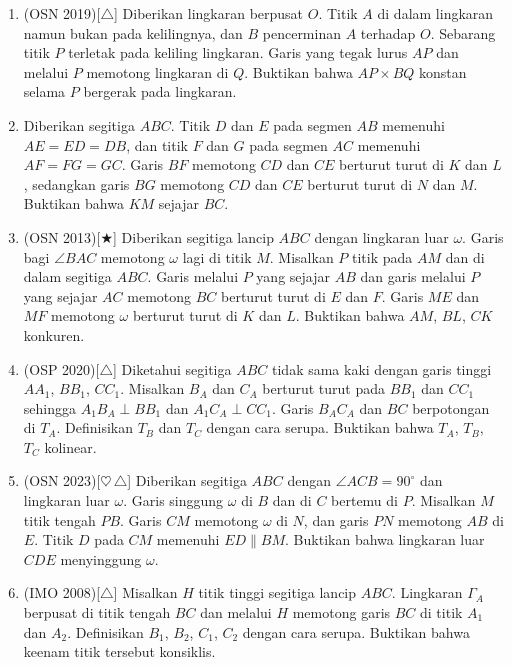 \documentclass[letterpaper, 13pt]{scrartcl}
\begin{document}
\begin{enumerate}
  \item (OSN 2019)[$\triangle$] Diberikan lingkaran berpusat $O$. Titik $A$ di dalam lingkaran namun bukan pada kelilingnya, dan $B$ pencerminan $A$ terhadap $O$. Sebarang titik $P$ terletak pada keliling lingkaran. Garis yang tegak lurus $AP$ dan melalui $P$ memotong lingkaran di $Q$. Buktikan bahwa $AP \times BQ$ konstan selama $P$ bergerak pada lingkaran.

  \item Diberikan segitiga $ABC$. Titik $D$ dan $E$ pada segmen $AB$ memenuhi $AE = ED = DB$, dan titik $F$ dan $G$ pada segmen $AC$ memenuhi $AF = FG = GC$. Garis $BF$ memotong $CD$ dan $CE$ berturut turut di $K$ dan $L$, sedangkan garis $BG$ memotong $CD$ dan $CE$ berturut turut di $N$ dan $M$. Buktikan bahwa $KM$ sejajar $BC$.

  \item (OSN 2013)[$\bigstar$] Diberikan segitiga lancip $ABC$ dengan lingkaran luar $\omega$. Garis bagi $\angle BAC$ memotong $\omega$ lagi di titik $M$. Misalkan $P$ titik pada $AM$ dan di dalam segitiga $ABC$. Garis melalui $P$ yang sejajar $AB$ dan garis melalui $P$ yang sejajar $AC$ memotong $BC$ berturut turut di $E$ dan $F$. Garis $ME$ dan $MF$ memotong $\omega$ berturut turut di $K$ dan $L$. Buktikan bahwa $AM$, $BL$, $CK$ konkuren.

  \item (OSP 2020)[$\triangle$] Diketahui segitiga $ABC$ tidak sama kaki dengan garis tinggi $AA_1$, $BB_1$, $CC_1$. Misalkan $B_A$ dan $C_A$ berturut turut pada $BB_1$ dan $CC_1$ sehingga $A_1B_A \perp BB_1$ dan $A_1C_A \perp CC_1$. Garis $B_AC_A$ dan $BC$ berpotongan di $T_A$. Definisikan $T_B$ dan $T_C$ dengan cara serupa. Buktikan bahwa $T_A$, $T_B$, $T_C$ kolinear.

  \newpage
  \item (OSN 2023)[$\heartsuit\,\triangle$] Diberikan segitiga $ABC$ dengan $\angle ACB = 90^\circ$ dan lingkaran luar $\omega$. Garis singgung $\omega$ di $B$ dan di $C$ bertemu di $P$. Misalkan $M$ titik tengah $PB$. Garis $CM$ memotong $\omega$ di $N$, dan garis $PN$ memotong $AB$ di $E$. Titik $D$ pada $CM$ memenuhi $ED \parallel BM$. Buktikan bahwa lingkaran luar $CDE$ menyinggung $\omega$.

  \item (IMO 2008)[$\triangle$] Misalkan $H$ titik tinggi segitiga lancip $ABC$. Lingkaran $\Gamma_A$ berpusat di titik tengah $BC$ dan melalui $H$ memotong garis $BC$ di titik $A_1$ dan $A_2$. Definisikan $B_1$, $B_2$, $C_1$, $C_2$ dengan cara serupa. Buktikan bahwa keenam titik tersebut konsiklis.


\end{enumerate}
\end{document}
